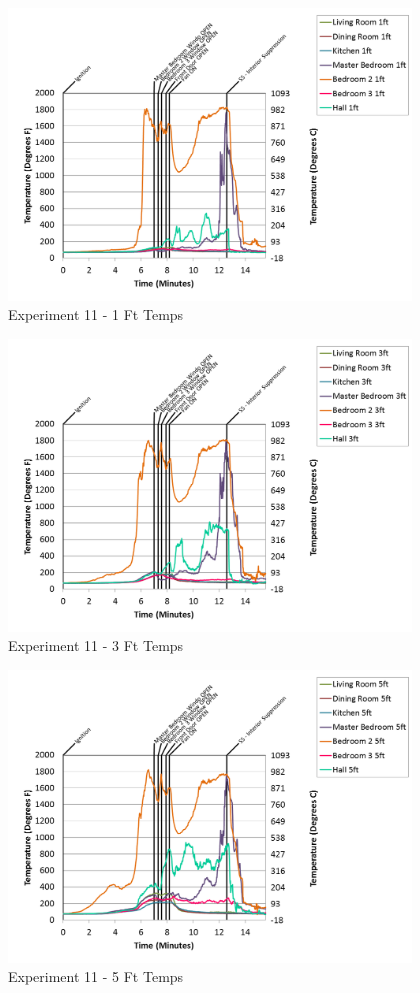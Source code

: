 \documentclass{article}
\begin{document}
\begin{appendices}
\begin{figure}[h!]
	\centering
	\includegraphics[height=3.05in]{0_Images/Results_Charts/Exp_11_Charts/1FtTemps.png}
	\caption{Experiment 11 - 1 Ft Temps}
\end{figure}


\begin{figure}[h!]
	\centering
	\includegraphics[height=3.05in]{0_Images/Results_Charts/Exp_11_Charts/3FtTemps.png}
	\caption{Experiment 11 - 3 Ft Temps}
\end{figure}

\clearpage

\begin{figure}[h!]
	\centering
	\includegraphics[height=3.05in]{0_Images/Results_Charts/Exp_11_Charts/5FtTemps.png}
	\caption{Experiment 11 - 5 Ft Temps}
\end{figure}



\end{appendices}
\end{document}
